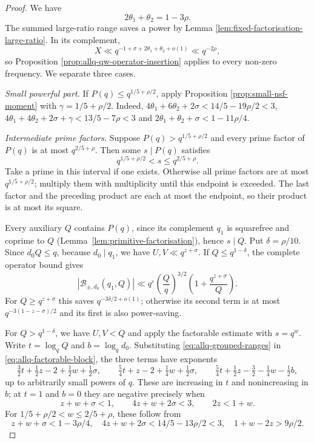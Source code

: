 \documentclass[12pt, a4paper]{amsart}
\numberwithin{equation}{section}
\newcommand{\ep}{\varepsilon}
\renewcommand{\le}{\leqslant}
\renewcommand{\ge}{\geqslant}
\theoremstyle{plain}
\begin{document}
\begin{proof}
We have
\begin{equation}\label{eq:allq-preliminary-identity}
2\theta_1+\theta_2=1-3\rho.
\end{equation}
The summed large-ratio range saves a power by Lemma \ref{lem:fixed-factorisation-large-ratio}. In its complement,
$$
X\ll q^{-1+\sigma+2\theta_1+\theta_2+o(1)}\ll q^{-2\rho},
$$
so Proposition \ref{prop:allq-qw-operator-insertion} applies to every non-zero frequency. We separate three cases.

\emph{Small powerful part.} If $P(q)\le q^{1/5+\rho/2}$, apply Proposition \ref{prop:small-nsf-moment} with $\gamma=1/5+\rho/2$. Indeed, $4\theta_1+6\theta_2+2\sigma<14/5-19\rho/2<3$, $4\theta_1+4\theta_2+2\sigma+\gamma<13/5-7\rho<3$ and $2\theta_1+\theta_2+\sigma<1-11\rho/4$.

\emph{Intermediate prime factors.} Suppose $P(q)>q^{1/5+\rho/2}$ and every prime factor of $P(q)$ is at most $q^{2/5+\rho}$. Then some $s\mid P(q)$ satisfies
\begin{equation}\label{eq:allq-medium-divisor}
q^{1/5+\rho/2}<s\le q^{2/5+\rho}.
\end{equation}
Take a prime in this interval if one exists. Otherwise all prime factors are at most $q^{1/5+\rho/2}$; multiply them with multiplicity until this endpoint is exceeded. The last factor and the preceding product are each at most the endpoint, so their product is at most its square.

Every auxiliary $Q$ contains $P(q)$, since its complement $q_1$ is squarefree and coprime to $Q$ (Lemma~\ref{lem:primitive-factorisation}), hence $s\mid Q$. Put $\delta=\rho/10$. Since $d_0Q\le q$, because $d_0\mid q_1$, we have $U,V\ll q^{z+\sigma}$. If $Q\le q^{1-\delta}$, the complete operator bound gives
\begin{equation}\label{eq:allq-proper-auxiliary}
|\mathcal B_{\pm,d_0}(q_1,Q)|
\ll q^\ep
\left(\frac Qq\right)^{3/2}
\left(1+\frac{q^{z+\sigma}}Q\right).
\end{equation}
For $Q\ge q^{z+\sigma}$ this saves $q^{-3\delta/2+o(1)}$; otherwise its second term is at most $q^{-3(1-z-\sigma)/2}$ and its first is also power-saving.

 For $Q>q^{1-\delta}$, we have $U,V<Q$ and apply the factorable estimate with $s=q^{w}$. Write $t=\log_qQ$ and $b=\log_qd_0$. Substituting \eqref{eq:allq-grouped-ranges} in \eqref{eq:allq-factorable-block}, the three terms have exponents
$$
\tfrac32t+\tfrac12z-2+\tfrac12w+\tfrac12\sigma,\qquad
\tfrac54t+z-2+\tfrac14w+\tfrac12\sigma,\qquad
\tfrac54t+\tfrac12z-\tfrac32-\tfrac14w-\tfrac12b,
$$
up to arbitrarily small powers of $q$. These are increasing in $t$ and nonincreasing in $b$; at $t=1$ and $b=0$ they are negative precisely when
\begin{equation}\label{eq:allq-factorable-conditions}
z+w+\sigma<1,\qquad
4z+w+2\sigma<3,\qquad
2z<1+w.
\end{equation}
For $1/5+\rho/2<w\le2/5+\rho$, these follow from
$$
z+w+\sigma<1-3\rho/4,\quad
4z+w+2\sigma<14/5-13\rho/2<3,\quad
1+w-2z>9\rho/2.
$$


\end{proof}
\end{document}
